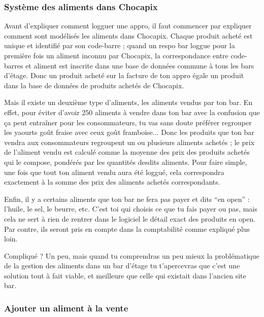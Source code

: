 \documentclass[12pt,french]{article}
\begin{document}
\subsubsection{Système des aliments dans Chocapix}

Avant d'expliquer comment logguer une appro, il faut commencer par expliquer comment sont modélisés les aliments dans Chocapix. Chaque produit acheté est unique et identifié par son code-barre ; quand un respo bar loggue pour la première fois un aliment inconnu par Chocapix, la correspondance entre code-barres et aliment est inscrite dans une base de données commune à tous les bars d'étage. Donc un produit acheté sur la facture de ton appro égale un produit dans la base de données de produits achetés de Chocapix.

Mais il existe un deuxième type d'aliments, les aliments vendus par ton bar. En effet, pour éviter d'avoir 250 aliments à vendre dans ton bar avec la confusion que ça peut entraîner pour les consommateurs, tu vas sans doute préférer regrouper les yaourts goût fraise avec ceux goût framboise... Donc les produits que ton bar vendra aux consommateurs regroupent un ou plusieurs aliments achetés ; le prix de l'aliment vendu est calculé comme la moyenne des prix des produits achetés qui le compose, pondérés par les quantités desdits aliments. Pour faire simple, une fois que tout ton aliment vendu aura été loggué, cela correspondra exactement à la somme des prix des aliments achetés correspondants.

Enfin, il y a certains aliments que ton bar ne fera pas payer et dits \enquote{en open} : l'huile, le sel, le beurre, etc. C'est toi qui choisis ce que tu fais payer ou pas, mais cela ne sert à rien de rentrer dans le logiciel le détail exact des produits en open. Par contre, ils seront pris en compte dans la comptabilité comme expliqué plus loin.

Compliqué ? Un peu, mais quand tu comprendras un peu mieux la problématique de la gestion des aliments dans un bar d'étage tu t'apercevras que c'est une solution tout à fait viable, et meilleure que celle qui existait dans l'ancien site bar.

\subsubsection{Ajouter un aliment à la vente}
\end{document}

